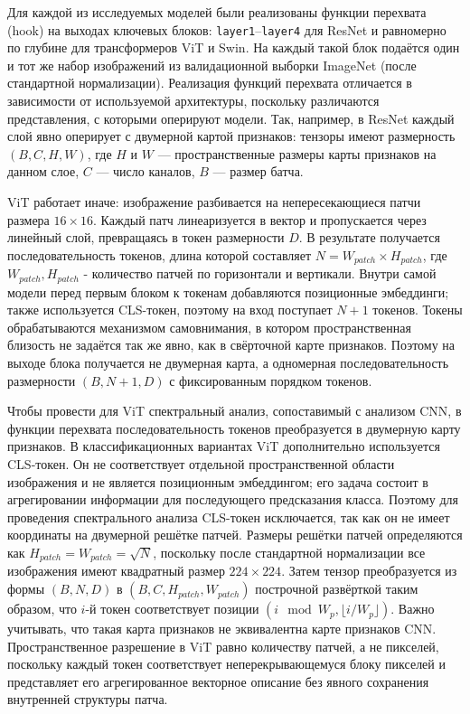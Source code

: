 Для каждой из исследуемых моделей были реализованы функции перехвата (hook) на выходах ключевых блоков: \texttt{layer1}--\texttt{layer4} для ResNet и равномерно по глубине для трансформеров ViT и Swin. На каждый такой блок подаётся один и тот же набор изображений из валидационной выборки ImageNet \cite{priyerana_imagenet10k} (после стандартной нормализации). 
Реализация функций перехвата отличается в зависимости от используемой архитектуры, поскольку различаются представления, с которыми оперируют модели. Так, например, в ResNet каждый слой явно оперирует с двумерной картой признаков: тензоры имеют размерность $(B, C, H, W)$, где $H$ и $W$ — пространственные размеры карты признаков на данном слое, $C$ — число каналов, $B$ — размер батча. 

ViT работает иначе: изображение разбивается на непересекающиеся патчи размера $16\times16$. Каждый патч линеаризуется в вектор и пропускается через линейный слой, превращаясь в токен размерности $D$. В результате получается последовательность токенов, длина которой составляет $N = W_{patch}\times H_{patch}$, где $W_{patch}, H_{patch}$ - количество патчей по горизонтали и вертикали. Внутри самой модели перед первым блоком к токенам добавляются позиционные эмбеддинги; также используется CLS-токен, поэтому на вход поступает $N+1$ токенов. Токены обрабатываются механизмом самовнимания, в котором пространственная близость не задаётся так же явно, как в свёрточной карте признаков. Поэтому на выходе блока получается не двумерная карта, а одномерная последовательность размерности $(B, N+1,D)$ с фиксированным порядком токенов. 

Чтобы провести для ViT спектральный анализ, сопоставимый с анализом CNN, в функции перехвата последовательность токенов преобразуется в двумерную карту признаков. В классификационных вариантах ViT дополнительно используется CLS-токен. Он не соответствует отдельной пространственной области изображения и не является позиционным эмбеддингом; его задача состоит в агрегировании информации для последующего предсказания класса.
Поэтому для проведения спектрального анализа CLS-токен исключается, так как он не имеет координаты на двумерной решётке патчей. Размеры решётки патчей определяются как $H_{patch} = W_{patch} = \sqrt{N}$, поскольку после стандартной нормализации все изображения имеют квадратный размер $224\times 224$. Затем тензор преобразуется из формы $(B, N, D)$ в $(B, C, H_{patch}, W_{patch})$ построчной развёрткой таким образом, что $i$-й токен соответствует позиции $(i\mod W_p ,\lfloor i / W_p \rfloor)$. Важно учитывать, что такая карта признаков не эквивалентна карте признаков CNN. Пространственное разрешение в ViT равно количеству патчей, а не пикселей, поскольку каждый токен соответствует неперекрывающемуся блоку пикселей и представляет его агрегированное векторное описание без явного сохранения внутренней структуры патча.

